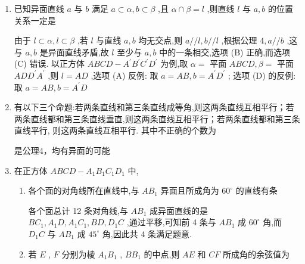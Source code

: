 \begin{enumerate}
    \begin{jieda}
        若直线 $l$ 不经过点 $A$ ,则过 $A$ 点作直线 ${l}^{\prime }//l$ ,若直线 $l$ 经过点 $A$ ,取 ${l}^{\prime } = l$ . 在空间中,任作一条过点 $A$ 且与直线 ${l}^{\prime }$ 成 $\dfrac{\pi }{3}$ 角的直线,再将该直线绕着直线 ${l}^{\prime }$ 旋转一周 (得到两个对顶的圆锥),即得到无数条符合要求的直线.
    \end{jieda}
    \item 已知异面直线 $a$ 与 $b$ 满足 $a \subset  \alpha ,b \subset  \beta$ ,且 $\alpha  \cap  \beta  = l$ ,则直线 $l$ 与 $a,b$ 的位置关系一定是
    \begin{jieda}
        由于 $l \subset  \alpha ,l \subset  \beta$ ,若 $l$ 与直线 $a,b$ 均无交点,则 $a//l,b//l$ ,根据公理 $4,a//b$ ,这与 $a,b$ 是异面直线矛盾,故 $l$ 至少与 $a,b$ 中的一条相交,选项 (B) 正确,而选项 (C) 错误. 以正方体 ${ABCD} - {A}^{\prime }{B}^{\prime }{C}^{\prime }{D}^{\prime }$ 为例,取 $\alpha  =$ 平面 ${ABCD},\beta  =$ 平面 ${AD}{D}^{\prime }{A}^{\prime }$ ,则 $l = {AD}$ ,选项 (A) 反例: 取 $a = {AB},b = {A}^{\prime }{D}^{\prime }$ ; 选项 (D) 的反例: 取 $a = {AB},b = {A}^{\prime }D$
    \end{jieda}
    \item 有以下三个命题:若两条直线和第三条直线成等角,则这两条直线互相平行；若两条直线都和第三条直线垂直,则这两条直线互相平行；若两条直线都和第三条直线平行, 则这两条直线互相平行. 其中不正确的个数为
    \begin{jieda}
        是公理4，均有异面的可能
    \end{jieda}
    \item 在正方体 ${ABCD} - {A}_{1}{B}_{1}{C}_{1}{D}_{1}$ 中,
    \begin{enumerate}
        \item 各个面的对角线所在直线中,与 $A{B}_{1}$ 异面且所成角为 ${60}^{ \circ  }$ 的直线有条
        \begin{jieda}
            各个面总计 12 条对角线,与 $A{B}_{1}$ 成异面直线的是 $B{C}_{1},{A}_{1}D,{A}_{1}{C}_{1},{BD},{D}_{1}C$ ,通过平移,可知前 4 条与 $A{B}_{1}$ 成 ${60}^{ \circ  }$ 角,而 ${D}_{1}C$ 与 $A{B}_{1}$ 成 ${45}^{ \circ  }$ 角,因此共 4 条满足题意.
        \end{jieda}
        \item 若 $E$ , $F$ 分别为棱 ${A}_{1}{B}_{1}$ , $B{B}_{1}$ 的中点,则 ${AE}$ 和 ${CF}$ 所成角的余弦值为

\end{enumerate}
\end{enumerate}
